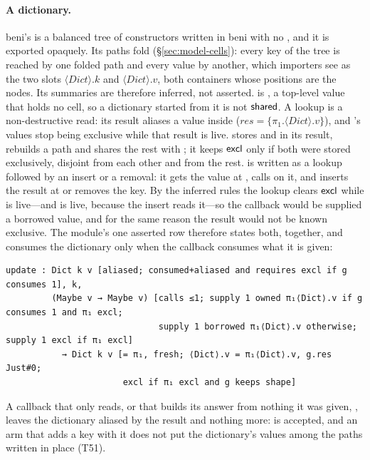 \paragraph{A dictionary.} beni's  is a balanced tree of constructors written in beni with
no , and it is exported opaquely. Its paths fold (\S\ref{sec:model-cells}): every key of the tree
is reached by one folded path and every value by another, which importers see as the two slots
$\langle\mathit{Dict}\rangle.k$ and $\langle\mathit{Dict}\rangle.v$, both containers whose positions are
the nodes. Its summaries are therefore inferred, not asserted.  is , a
top-level value that holds no cell, so a dictionary started from it is not $\mathsf{shared}$. A lookup  is a non-destructive read: its result aliases a value
inside  ($\mathit{res} = \{\pi_1.\langle\mathit{Dict}\rangle.v\}$), and 's values stop being
exclusive while that result is live.  stores  and  in its result,
rebuilds a path and shares the rest with ; it keeps $\mathsf{excl}$ only if both were stored exclusively,
disjoint from each other and from the rest.  is written as a lookup followed by an
insert or a removal: it gets the value at , calls  on it, and inserts the result at
 or removes the key. By the inferred rules the lookup clears $\mathsf{excl}$ while  is live---and
 is live, because the insert reads it---so the callback would be supplied a borrowed value, and
for the same reason the result would not be known exclusive. The module's one asserted row therefore
states both, together, and consumes the dictionary only when the callback consumes what it is given:
\begin{Verbatim}
update : Dict k v [aliased; consumed+aliased and requires excl if g consumes 1], k,
         (Maybe v → Maybe v) [calls ≤1; supply 1 owned π₁⟨Dict⟩.v if g consumes 1 and π₁ excl;
                              supply 1 borrowed π₁⟨Dict⟩.v otherwise; supply 1 excl if π₁ excl]
           → Dict k v [= π₁, fresh; ⟨Dict⟩.v = π₁⟨Dict⟩.v, g.res Just#0;
                       excl if π₁ excl and g keeps shape]
\end{Verbatim}
A callback that only reads, or that builds its answer from nothing it was given,
, leaves the dictionary aliased by the result and nothing more:
 is accepted, and an  arm that adds a key with it
does not put the dictionary's values among the paths written in place (T51).
